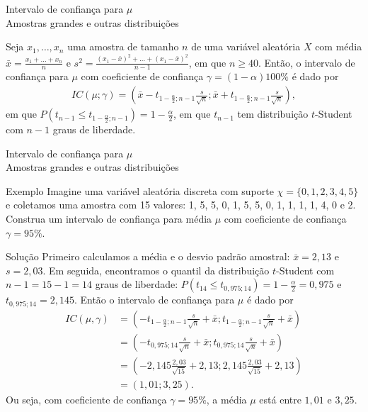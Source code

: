 \documentclass[8pt]{beamer}
\begin{document}
\begin{frame}{Intervalo de confiança para $\mu$\\ Amostras grandes e outras distribuições}

\huge

Seja $x_1, \dots, x_n$ uma amostra de tamanho $n$ de uma variável aleatória $X$ com média $\bar{x} = \frac{x_1 + \dots + x_n}{n}$ e $s^2 = \frac{(x_1 - \bar{x})^2 + \dots + (x_1 - \bar{x})^2}{n-1}$, em que $n \geq 40$. Então, o intervalo de confiança para $\mu$ com coeficiente de confiança $\gamma = (1-\alpha)100\%$ é dado por
\begin{align*}
IC(\mu; \gamma) = \left( \bar{x} -t_{1-\frac{\alpha}{2}; n-1} \frac{s}{\sqrt{n}}; \bar{x} + t_{1-\frac{\alpha}{2}; n-1} \frac{s}{\sqrt{n}} \right),
\end{align*}
em que $P\left( t_{n-1} \leq t_{1-\frac{\alpha}{2}; n-1} \right) = 1-  \frac{\alpha}{2}$, em que $t_{n-1}$ tem distribuição $t$-Student com $n-1$ graus de liberdade.

\normalsize

\end{frame}

\begin{frame}{Intervalo de confiança para $\mu$\\ Amostras grandes e outras distribuições}

\small

	\begin{block}{Exemplo}
		Imagine uma variável aleatória discreta com suporte $\chi=\{0,1,2,3,4,5\}$ e coletamos uma amostra com 15 valores: 1, 5, 5, 0, 1, 5, 5, 0, 1, 1, 1, 1, 4, 0 e 2. Construa um intervalo de confiança para média $\mu$ com coeficiente de confiança $\gamma=95\%$.
	\end{block}

	\begin{block}{Solução}
		Primeiro calculamos a média e o desvio padrão amostral: $\bar{x} = 2,13$ e $s= 2,03$. Em seguida, encontramos o quantil da distribuição $t$-Student com $n-1=15-1=14$ graus de liberdade: $P(t_{14} \leq t_{0,975;14})=1-\frac{\alpha}{2}=0,975$ e $t_{0,975;14} =2,145$. Então o intervalo de confiança para $\mu$ é dado por
		\begin{align*}
			IC(\mu, \gamma) &= \left( -t_{1-\frac{\alpha}{2};n-1} \frac{s}{\sqrt{n}} + \bar{x}; t_{1-\frac{\alpha}{2};n-1} \frac{s}{\sqrt{n}} + \bar{x} \right)\\
			&= \left( -t_{0,975;14} \frac{s}{\sqrt{n}} + \bar{x}; t_{0,975;14} \frac{s}{\sqrt{n}}  + \bar{x} \right)\\
			&= \left( -2,145 \frac{2,03}{\sqrt{15}} + 2,13; 2,145 \frac{2,03}{\sqrt{15}} + 2,13 \right)\\
			&= \left( 1,01; 3,25 \right).
		\end{align*}  
		Ou seja, com coeficiente de confiança $\gamma=95\%$, a média $\mu$ está entre $1,01$ e $3,25$.
		
	\end{block}

\normalsize 
\end{frame}
\end{document}

